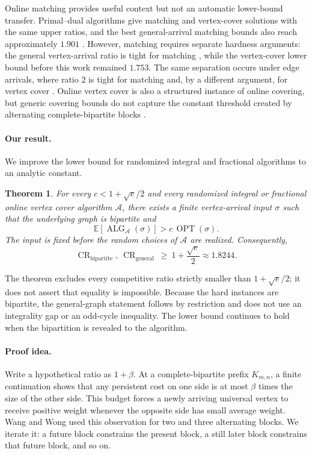 \documentclass[11pt,letterpaper]{article}
\newtheorem{theorem}{Theorem}
\theoremstyle{definition}
\theoremstyle{remark}
\newcommand{\ALG}{\operatorname{ALG}}
\newcommand{\OPT}{\operatorname{OPT}}
\newcommand{\CR}{\operatorname{CR}}
\begin{document}
Online matching provides useful context but not an automatic lower-bound transfer.
Primal--dual algorithms give matching and vertex-cover solutions with the same upper ratios, and the best general-arrival matching bounds also reach approximately $1.901$ \citep{WangWong2015,TangZhang2024}.
However, matching requires separate hardness arguments: the general vertex-arrival ratio is tight for matching \citep{Tang2026Matching}, while the vertex-cover lower bound before this work remained $1.753$.
The same separation occurs under edge arrivals, where ratio $2$ is tight for matching \citep{GamlathEtAl2019} and, by a different argument, for vertex cover \citep{DemangePaschos2005,TangZhang2026}.
Online vertex cover is also a structured instance of online covering, but generic covering bounds do not capture the constant threshold created by alternating complete-bipartite blocks \citep{BuchbinderNaor2009}.

\paragraph{Our result.}
We improve the lower bound for randomized integral and fractional algorithms to an analytic constant.

\begin{theorem}\label{thm:main}
For every $c<1+\sqrt{e}/2$ and every randomized integral or fractional online vertex cover algorithm $\mathcal A$, there exists a finite vertex-arrival input $\sigma$ such that the underlying graph is bipartite and
\begin{equation}\label{eq:main-ratio} \mathbb{E}[\ALG_{\mathcal A}(\sigma)]>c\,\OPT(\sigma). \end{equation}
The input is fixed before the random choices of $\mathcal A$ are realized.
Consequently,
\begin{equation}\label{eq:main-bound} \CR_{\mathrm{bipartite}},\ \CR_{\mathrm{general}}\ \ge\ 1+\frac{\sqrt{e}}{2}\approx 1.8244. \end{equation}
\end{theorem}

The theorem excludes every competitive ratio strictly smaller than $1+\sqrt e/2$; it does not assert that equality is impossible.
Because the hard instances are bipartite, the general-graph statement follows by restriction and does not use an integrality gap or an odd-cycle inequality.
The lower bound continues to hold when the bipartition is revealed to the algorithm.

\paragraph{Proof idea.}
Write a hypothetical ratio as $1+\beta$.
At a complete-bipartite prefix $K_{m,n}$, a finite continuation shows that any persistent cost on one side is at most $\beta$ times the size of the other side.
This budget forces a newly arriving universal vertex to receive positive weight whenever the opposite side has small average weight.
Wang and Wong used this observation for two and three alternating blocks.
We iterate it: a future block constrains the present block, a still later block constrains that future block, and so on.
\end{document}
